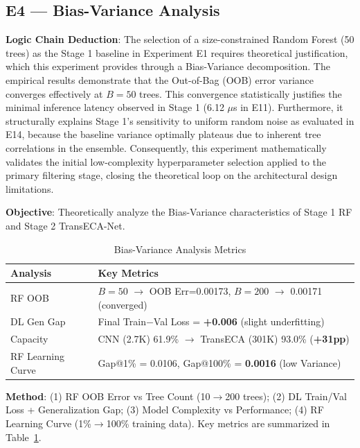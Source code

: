 \documentclass[sigconf]{acmart}
\begin{document}
\subsection{E4 --- Bias-Variance Analysis}
\textbf{Logic Chain Deduction}: The selection of a size-constrained Random Forest (50 trees) as the Stage 1 baseline in Experiment E1 requires theoretical justification, which this experiment provides through a Bias-Variance decomposition. The empirical results demonstrate that the Out-of-Bag (OOB) error variance converges effectively at $B=50$ trees. This convergence statistically justifies the minimal inference latency observed in Stage 1 (6.12 $\mu$s in E11). Furthermore, it structurally explains Stage 1's sensitivity to uniform random noise as evaluated in E14, because the baseline variance optimally plateaus due to inherent tree correlations in the ensemble. Consequently, this experiment mathematically validates the initial low-complexity hyperparameter selection applied to the primary filtering stage, closing the theoretical loop on the architectural design limitations.

\textbf{Objective}: Theoretically analyze the Bias-Variance characteristics of Stage 1 RF and Stage 2 TransECA-Net.


\begin{table}[!t]
\caption{Bias-Variance Analysis Metrics}
\label{tab:bias_variance}
\begin{tabular}{ll}
\toprule
\textbf{Analysis} & \textbf{Key Metrics} \\
\midrule
RF OOB & $B=50$ $\to$ OOB Err=0.00173, $B=200$ $\to$ 0.00171 (converged) \\
DL Gen Gap & Final Train$-$Val Loss = \textbf{+0.006} (slight underfitting) \\
Capacity & CNN (2.7K) 61.9\% $\to$ TransECA (301K) 93.0\% (\textbf{+31pp}) \\
RF Learning Curve & Gap@1\% = 0.0106, Gap@100\% = \textbf{0.0016} (low Variance) \\
\bottomrule
\end{tabular}
\end{table}
\textbf{Method}: (1) RF OOB Error vs Tree Count (10$\to$200 trees); (2) DL Train/Val Loss + Generalization Gap; (3) Model Complexity vs Performance; (4) RF Learning Curve (1\%$\to$100\% training data). Key metrics are summarized in Table~\ref{tab:bias_variance}.
\end{document}
